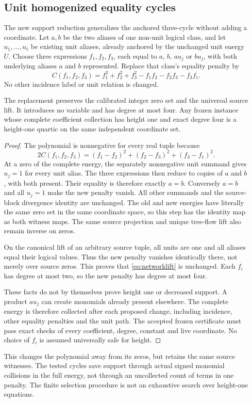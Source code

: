 \subsection{Unit homogenized equality cycles}
The new support reduction generalizes the anchored three-cycle without
adding a coordinate. Let $a,b$ be the two aliases of one non-unit logical
class, and let $u_1,\ldots,u_\ell$ be existing unit aliases, already
anchored by the unchanged unit energy $U$. Choose three expressions
$f_1,f_2,f_3$, each equal to $a$, $b$, $au_j$ or $bu_j$, with both
underlying aliases $a$ and $b$ represented. Replace that class's equality
penalty by
\begin{equation}\label{eq:unit-cycle}
 C(f_1,f_2,f_3)=f_1^2+f_2^2+f_3^2-f_1f_2-f_2f_3-f_3f_1.
\end{equation}
No other incidence label or unit relation is changed.

\begin{theorem}\label{thm:unit-cycle}
The replacement preserves the calibrated integer zero set and the
universal source lift. It introduces no variable and has degree at most
four. Any frozen instance whose complete coefficient collection has
height one and exact degree four is a height-one quartic on the same
independent coordinate set.
\end{theorem}
\begin{proof}
The polynomial is nonnegative for every real tuple because
\[
 2C(f_1,f_2,f_3)=(f_1-f_2)^2+(f_2-f_3)^2+(f_3-f_1)^2.
\]
At a zero of the complete energy, the separately nonnegative unit
summand gives $u_j=1$ for every unit alias. The three expressions then
reduce to copies of $a$ and $b$, with both present. Their equality is
therefore exactly $a=b$. Conversely $a=b$ and all $u_j=1$ make the
new penalty vanish. All other summands and the source-block divergence
identity are unchanged. The old and new energies have literally the same zero set in the same
coordinate space, so this step has the identity map as both witness maps.
The same source projection and unique tree-flow lift also remain inverse
on zeros.

On the canonical lift of an arbitrary source tuple, all units are one
and all aliases equal their logical values. Thus the new penalty
vanishes identically there, not merely over source zeros. This proves
that \eqref{eq:networklift} is unchanged. Each $f_i$ has degree at most
two, so the new penalty has degree at most four.

These facts do not by themselves prove height one or decreased support.
A product $au_j$ can create monomials already present elsewhere. The
complete energy is therefore collected after each proposed change,
including incidence, other equality penalties and the unit path.
The accepted frozen certificate must pass exact checks of every
coefficient, degree, constant and live coordinate. No choice of
$f_i$ is assumed universally safe for height.
\end{proof}
This changes the polynomial away from its zeros, but retains the same
source witnesses. The tested cycles save support through actual signed
monomial collisions in the full energy, not through an uncollected
count of terms in one penalty. The finite selection procedure is not an
exhaustive search over height-one equations.
